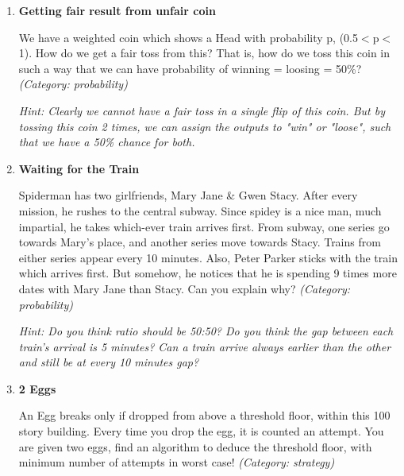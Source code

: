 \begin{enumerate}




\item \textbf{Getting fair result from unfair coin}

We have a weighted coin which shows a Head with probability p, (0.5$<$p$<$1). How do we get a fair toss from this? That is, how do we toss this coin in such a way that we can have probability of winning = loosing = 50\%?
\small\emph{(Category: probability)}

\small\emph{Hint: Clearly we cannot have a fair toss in a single flip of this coin. But by tossing this coin 2 times, we can assign the outputs to "win" or "loose", such that we have a 50\% chance for both.}





\item \textbf{Waiting for the Train}

Spiderman has two girlfriends, Mary Jane \& Gwen Stacy. After every mission, he rushes to the central subway. Since spidey is a nice man, much impartial, he takes which-ever train arrives first. From subway, one series go towards Mary's place, and another series move towards Stacy. Trains from either series appear every 10 minutes. Also, Peter Parker sticks with the train which arrives first.
But somehow, he notices that he is spending 9 times more dates with Mary Jane than Stacy. Can you explain why?
\small\emph{(Category: probability)}

\small\emph{Hint: Do you think ratio should be 50:50? Do you think the gap between each train's arrival is 5 minutes? Can a train arrive always earlier than the other and still be at every 10 minutes gap?}





\item \textbf{2 Eggs}

An Egg breaks only if dropped from above a threshold floor, within this 100 story building. Every time you drop the egg, it is counted an attempt. You are given two eggs, find an algorithm to deduce the threshold floor, with minimum number of attempts in worst case!
\small\emph{(Category: strategy)}


\end{enumerate}
